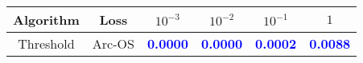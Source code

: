 \begin{table}[t]
\centering
\begin{tabularx}{.7\textwidth}{c|c|cccc}
\bf Algorithm & \bf Loss & $10^{-3}$ & $10^{-2}$ & $10^{-1}$ & $1$\\\hline\hline
\multirow{1}{*}{Threshold} & Arc-OS & \textcolor{blue}{\bf 0.0000} & \textcolor{blue}{\bf 0.0000} & \textcolor{blue}{\bf 0.0002} & \textcolor{blue}{\bf 0.0088}\\
\hline
\end{tabularx}
\end{table}